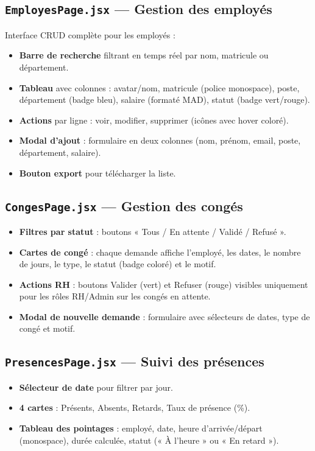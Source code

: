 \documentclass[a4paper,12pt]{report}
\begin{document}
\subsection{\texttt{EmployesPage.jsx} --- Gestion des employés}
Interface CRUD complète pour les employés :
\begin{itemize}
  \item \textbf{Barre de recherche} filtrant en temps réel par nom, matricule ou département.
  \item \textbf{Tableau} avec colonnes : avatar/nom, matricule (police monospace), poste, département (badge bleu), salaire (formaté MAD), statut (badge vert/rouge).
  \item \textbf{Actions} par ligne : voir, modifier, supprimer (icônes avec hover coloré).
  \item \textbf{Modal d'ajout} : formulaire en deux colonnes (nom, prénom, email, poste, département, salaire).
  \item \textbf{Bouton export} pour télécharger la liste.
\end{itemize}

\subsection{\texttt{CongesPage.jsx} --- Gestion des congés}
\begin{itemize}
  \item \textbf{Filtres par statut} : boutons « Tous / En attente / Validé / Refusé ».
  \item \textbf{Cartes de congé} : chaque demande affiche l'employé, les dates, le nombre de jours, le type, le statut (badge coloré) et le motif.
  \item \textbf{Actions RH} : boutons Valider (vert) et Refuser (rouge) visibles uniquement pour les rôles RH/Admin sur les congés en attente.
  \item \textbf{Modal de nouvelle demande} : formulaire avec sélecteurs de dates, type de congé et motif.
\end{itemize}

\subsection{\texttt{PresencesPage.jsx} --- Suivi des présences}
\begin{itemize}
  \item \textbf{Sélecteur de date} pour filtrer par jour.
  \item \textbf{4 cartes} : Présents, Absents, Retards, Taux de présence (\%).
  \item \textbf{Tableau des pointages} : employé, date, heure d'arrivée/départ (monospace), durée calculée, statut (« À l'heure » ou « En retard »).
\end{itemize}
\end{document}
